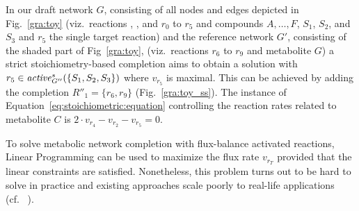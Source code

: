 %
In our draft network $G$,
consisting of all  nodes and edges depicted in Fig.~\ref{gra:toy}
(viz.\ reactions \SeedReaction, \SeedReactiont, \ExportReaction{} and $r_0$ to $r_5$ and compounds $A,\dots,F$, $S_1$, $S_2$, and $S_3$ and $r_5$ the single target reaction)
and the reference network $G'$,
consisting of the shaded part of Fig~\ref{gra:toy},
(viz.\ reactions $r_6$ to $r_9$ and metabolite $G$)
a strict stoichiometry-based completion aims to obtain a solution with $r_5\in\mathit{active}^{s}_{G''}(\{S_1,S_2,S_3\})$ where $v_{r_5}$ is maximal.
%
This can be achieved by adding the completion $R''_1=\{r_{6},r_9\}$ (Fig.~\ref{gra:toy_ss}).
%
%
The instance of Equation~\eqref{eq:stoichiometric:equation} controlling the reaction rates related to metabolite $C$ is
\(
2\cdot v_{r_4} - v_{r_2} - v_{r_5} = 0
\).


To solve metabolic network completion with flux-balance activated reactions,
Linear Programming can be used to maximize the flux rate $v_{r_T}$ provided that the linear constraints are satisfied.
%
Nonetheless, this problem turns out to be hard to solve in practice and existing approaches scale poorly to real-life applications (cf.~ \citep{Orth2010}).

